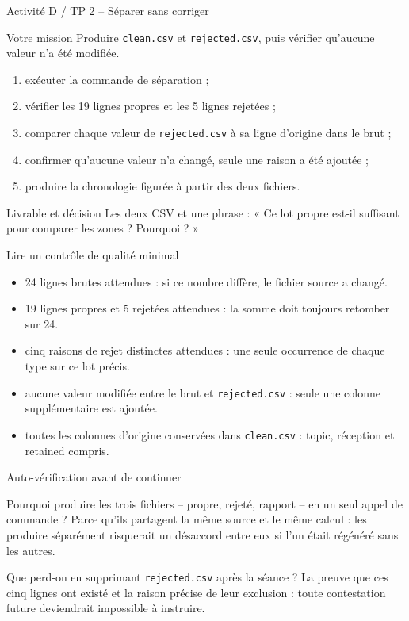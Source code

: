 \documentclass[aspectratio=169]{beamer}
\begin{document}
\begin{frame}{Activité D / TP 2 -- Séparer sans corriger}
  \begin{block}{Votre mission}
    Produire \texttt{clean.csv} et \texttt{rejected.csv}, puis vérifier qu'aucune valeur n'a été modifiée.
  \end{block}
  \begin{enumerate}
    \item exécuter la commande de séparation ;
    \item vérifier les 19 lignes propres et les 5 lignes rejetées ;
    \item comparer chaque valeur de \texttt{rejected.csv} à sa ligne d'origine dans le brut ;
    \item confirmer qu'aucune valeur n'a changé, seule une raison a été ajoutée ;
    \item produire la chronologie figurée à partir des deux fichiers.
  \end{enumerate}
  \begin{block}{Livrable et décision}
    Les deux CSV et une phrase : « Ce lot propre est-il suffisant pour comparer les zones ? Pourquoi ? »
  \end{block}
\end{frame}

\begin{frame}{Lire un contrôle de qualité minimal}
  \begin{itemize}
    \item 24 lignes brutes attendues : si ce nombre diffère, le fichier source a changé.
    \item 19 lignes propres et 5 rejetées attendues : la somme doit toujours retomber sur 24.
    \item cinq raisons de rejet distinctes attendues : une seule occurrence de chaque type sur ce lot précis.
    \item aucune valeur modifiée entre le brut et \texttt{rejected.csv} : seule une colonne supplémentaire est ajoutée.
    \item toutes les colonnes d'origine conservées dans \texttt{clean.csv} : topic, réception et retained compris.
  \end{itemize}
\end{frame}

\begin{frame}{Auto-vérification avant de continuer}
  \small
  \begin{block}{Pourquoi produire les trois fichiers -- propre, rejeté, rapport -- en un seul appel de commande ?}
    Parce qu'ils partagent la même source et le même calcul : les produire séparément risquerait un désaccord entre eux si l'un était régénéré sans les autres.
  \end{block}
  \begin{block}{Que perd-on en supprimant \texttt{rejected.csv} après la séance ?}
    La preuve que ces cinq lignes ont existé et la raison précise de leur exclusion : toute contestation future deviendrait impossible à instruire.
  \end{block}
\end{frame}
\end{document}
